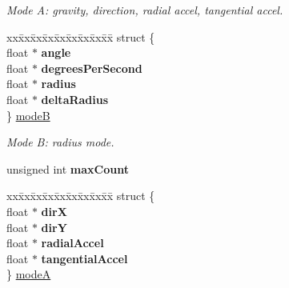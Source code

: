 \begin{DoxyCompactItemize}
\begin{tabbing}
\end{tabbing}\begin{DoxyCompactList}\small\item\em Mode A\+: gravity, direction, radial accel, tangential accel. \end{DoxyCompactList}\item 
\mbox{\label{classParticleData_a99a71379747139d23fc0b37cecb66edc}} 
\begin{tabbing}
xx\=xx\=xx\=xx\=xx\=xx\=xx\=xx\=xx\=\kill
struct \{\\
\>float $\ast$ {\bfseries angle}\\
\>float $\ast$ {\bfseries degreesPerSecond}\\
\>float $\ast$ {\bfseries radius}\\
\>float $\ast$ {\bfseries deltaRadius}\\
\} \hyperlink{classParticleData_a99a71379747139d23fc0b37cecb66edc}{modeB}\\

\end{tabbing}\begin{DoxyCompactList}\small\item\em Mode B\+: radius mode. \end{DoxyCompactList}\item 
\mbox{\label{classParticleData_a5c6084a9e87d4fdb196ce5536088356a}} 
unsigned int {\bfseries max\+Count}
\item 
\mbox{\label{classParticleData_a8a327de6af068c64f0a9e740893c530a}} 
\begin{tabbing}
xx\=xx\=xx\=xx\=xx\=xx\=xx\=xx\=xx\=\kill
struct \{\\
\>float $\ast$ {\bfseries dirX}\\
\>float $\ast$ {\bfseries dirY}\\
\>float $\ast$ {\bfseries radialAccel}\\
\>float $\ast$ {\bfseries tangentialAccel}\\
\} \hyperlink{classParticleData_a8a327de6af068c64f0a9e740893c530a}{modeA}\\


\end{tabbing}
\end{DoxyCompactItemize}
